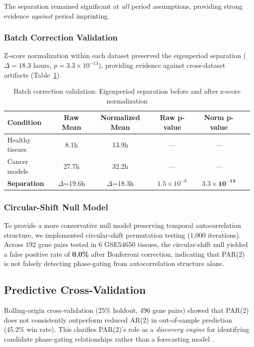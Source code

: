 \documentclass[11pt,a4paper]{article}
\begin{document}
The separation remained significant at \textit{all} period assumptions, providing strong evidence \textit{against} period imprinting.

\subsubsection*{Batch Correction Validation}

Z-score normalization within each dataset preserved the eigenperiod separation ($\Delta = 18.3$ hours, $p = 3.3 \times 10^{-13}$), providing evidence against cross-dataset artifacts (Table~\ref{tab:batch_correction}).

\begin{table}[H]
\centering
\caption{Batch correction validation: Eigenperiod separation before and after z-score normalization}
\label{tab:batch_correction}
\begin{tabular}{lccccc}
\toprule
Condition & Raw Mean & Normalized Mean & Raw p-value & Norm p-value \\
\midrule
Healthy tissues & 8.1h & 13.9h & --- & --- \\
Cancer models & 27.7h & 32.2h & --- & --- \\
\midrule
\textbf{Separation} & $\Delta$=19.6h & $\Delta$=18.3h & $1.5\times10^{-8}$ & $\mathbf{3.3\times10^{-13}}$ \\
\bottomrule
\end{tabular}
\end{table}

\subsubsection*{Circular-Shift Null Model}

To provide a more conservative null model preserving temporal autocorrelation structure, we implemented circular-shift permutation testing (1,000 iterations). Across 192 gene pairs tested in 6 GSE54650 tissues, the circular-shift null yielded a false positive rate of \textbf{0.0\%} after Bonferroni correction, indicating that PAR(2) is not falsely detecting phase-gating from autocorrelation structure alone.

\subsection{Predictive Cross-Validation}

Rolling-origin cross-validation (25\% holdout, 496 gene pairs) showed that PAR(2) does not consistently outperform reduced AR(2) in out-of-sample prediction (45.2\% win rate). This clarifies PAR(2)'s role as a \textit{discovery engine} for identifying candidate phase-gating relationships rather than a forecasting model \citep{shmueli2010}.
\end{document}
